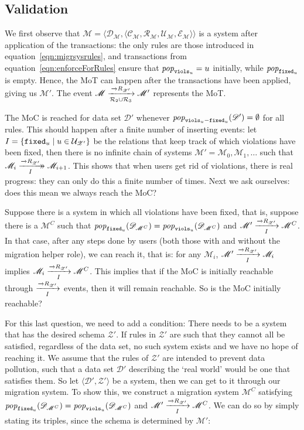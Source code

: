 \documentclass[runningheads]{llncs}
\newcommand{\xrightarrowdbl}[2][]{%
  \xrightarrow[#1]{#2}\mathrel{\mkern-14mu}\rightarrow
}
\newcommand{\id}[1]{\text{\it #1\/}}
\newcommand{\popF}[1]{\id{pop}_{#1}}
\newcommand{\pop}[2]{\popF{#1}(#2)}
\newcommand{\pair}[2]{\langle{#1},{#2}\rangle}
\newcommand{\quadruple}[4]{\langle{#1},{#2},{#3},{#4}\rangle}
\newcommand{\concepts}{\mathcal{C}}
\newcommand{\rels}{\mathcal{R}}   %
\newcommand{\transactions}{\mathcal{E}}
\newcommand{\rules}{\mathcal{U}}
\newcommand{\dataset}{\mathscr{D}}
\newcommand{\schema}{\mathscr{Z}}
\newcommand{\migrsys}{\mathscr{M}}
\begin{document}
\subsection{Validation}
   We first observe that $\migrsys = \pair{\dataset_\migrsys}{\quadruple{\concepts_\migrsys}{\rels_\migrsys}{\rules_\migrsys}{\transactions_\migrsys}}$ is a system after application of the transactions:
   the only rules are those introduced in equation~\ref{eqn:migrsysrules}, and transactions from equation~\ref{eqn:enforceForRules} ensure that $\popF{{\tt viols}_u} = u$ initially, while $\popF{{\tt fixed}_u}$ is empty.
   Hence, the MoT can happen after the transactions have been applied, giving us $\migrsys'$.
   The event $\migrsys \xrightarrow[\rels_2 \cup \rels_3]{\overrightarrow\rels_{\schema'}}\migrsys'$ represents the MoT.
   
   The MoC is reached for data set $\dataset'$ whenever $\pop{{\tt viols}_u - {\tt fixed}_u}{\dataset'}=\emptyset$ for all rules.
   This should happen after a finite number of inserting events: let $I = \{{\tt fixed}_u \mid u\in\rules_{\schema'}\}$ be the relations that keep track of which violations have been fixed, then there is no infinite chain of systems $\migrsys' = \migrsys_0, \migrsys_1,\ldots$ such that $\migrsys_i\xrightarrowdbl[I]{\overrightarrow\rels_{\schema'}}\migrsys_{i+1}$.
   This shows that when users get rid of violations, there is real progress: they can only do this a finite number of times.
   Next we ask ourselves: does this mean we always reach the MoC?
   
   Suppose there is a system in which all violations have been fixed, that is, suppose there is a $\migrsys^C$ such that $\pop{{\tt fixed}_u}{\dataset_{\migrsys^C}}=\pop{{\tt viols}_u}{\dataset_{\migrsys^C}}$ and $\migrsys'\xrightarrow[I]{\overrightarrow\rels_{\schema'}} \migrsys^C$.
   In that case, after any steps done by users (both those with and without the migration helper role), we can reach it, that is: for any $\migrsys_i$, $\migrsys'\xrightarrow[I]{\overrightarrow\rels_{\schema'}} \migrsys_i$ implies $\migrsys_i\xrightarrow[I]{\overrightarrow\rels_{\schema'}} \migrsys^C$.
   This implies that if the MoC is initially reachable through $\xrightarrow[I]{\overrightarrow\rels_{\schema'}}$ events, then it will remain reachable.
   So is the MoC initially reachable?
   
   For this last question, we need to add a condition:
   There needs to be a system that has the desired schema $\schema'$.
   If rules in $\schema'$ are such that they cannot all be satisfied, regardless of the data set, no such system exists and we have no hope of reaching it.
   We assume that the rules of $\schema'$ are intended to prevent data pollution, such that a data set $\dataset'$ describing the `real world' would be one that satisfies them.
   So let $\pair{\dataset'}{\schema'}$ be a system, then we can get to it through our migration system.
   To show this, we construct a migration system $\migrsys^C$ satisfying $\pop{{\tt fixed}_u}{\dataset_{\migrsys^C}}=\pop{{\tt viols}_u}{\dataset_{\migrsys^C}}$ and $\migrsys'\xrightarrow[I]{\overrightarrow\rels_{\schema'}} \migrsys^C$.
   We can do so by simply stating its triples, since the schema is determined by $\migrsys'$:
   
\end{document}
